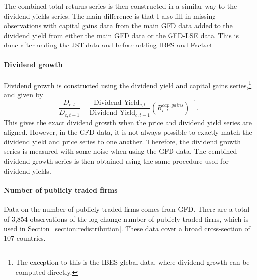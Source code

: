 The combined total returns series is then constructed in a similar way to the dividend yields series.  The main difference is that I also fill in missing observations with capital gains data from the main GFD data added to the dividend yield from either the main GFD data or the GFD-LSE data. This is done after adding the JST data and before adding IBES and Factset.

\paragraph{Dividend growth}
Dividend growth is constructed using the dividend yield and capital gains series,\footnote{The exception to this is the IBES global data,  where dividend growth can be computed directly.} and given by
\begin{equation*}
\frac{D_{c,t}}{D_{c,t-1}} = \frac{\text{Dividend Yield}_{c,t}}{\text{Dividend Yield}_{c,t-1}}(R^{cap. \; gains}_{c,t})^{-1}.
\end{equation*}
This gives the exact dividend growth when the price and dividend yield series are aligned. However, in the GFD data, it is not always possible to exactly match the dividend yield and price series to one another. Therefore, the dividend growth series is measured with some noise when using the GFD data.  The combined dividend growth series is then obtained using the same procedure used for dividend yields. 

\paragraph{Number of publicly traded firms}
Data on the number of publicly traded firms comes from GFD. There are a total of 3,854 observations of the log change number of publicly traded firms, which is used in Section~\ref{section:redistribution}. These data cover a broad cross-section of 107 countries.

